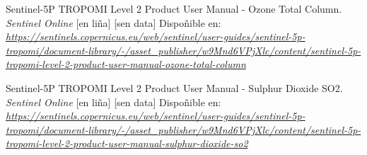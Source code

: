 \begin{thebibliography}{99}
     Sentinel-5P TROPOMI Level 2 Product User Manual - Ozone Total Column. \textit{Sentinel Online} [en liña] [sen data] Dispoñible en: \textit{\url{https://sentinels.copernicus.eu/web/sentinel/user-guides/sentinel-5p-tropomi/document-library/-/asset_publisher/w9Mnd6VPjXlc/content/sentinel-5p-tropomi-level-2-product-user-manual-ozone-total-column}}

     Sentinel-5P TROPOMI Level 2 Product User Manual - Sulphur Dioxide SO2. \textit{Sentinel Online} [en liña] [sen data] Dispoñible en: \textit{\url{https://sentinels.copernicus.eu/web/sentinel/user-guides/sentinel-5p-tropomi/document-library/-/asset_publisher/w9Mnd6VPjXlc/content/sentinel-5p-tropomi-level-2-product-user-manual-sulphur-dioxide-so2}}





\end{thebibliography}

